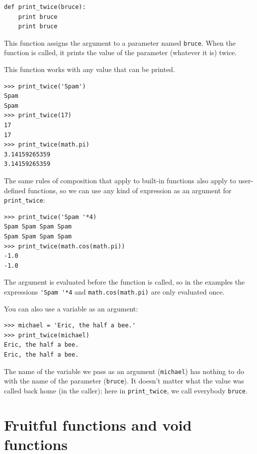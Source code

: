 \documentclass[10pt]{book}
\begin{document}

\beforeverb
\begin{verbatim}
def print_twice(bruce):
    print bruce
    print bruce
\end{verbatim}
\afterverb
%
This function assigns the argument to a parameter
named {\tt bruce}.  When the function is called, it prints the value of
the parameter (whatever it is) twice.

This function works with any value that can be printed.

\beforeverb
\begin{verbatim}
>>> print_twice('Spam')
Spam
Spam
>>> print_twice(17)
17
17
>>> print_twice(math.pi)
3.14159265359
3.14159265359
\end{verbatim}
\afterverb
%
The same rules of composition that apply to built-in functions also
apply to user-defined functions, so we can use any kind of expression
as an argument for \verb"print_twice":


\beforeverb
\begin{verbatim}
>>> print_twice('Spam '*4)
Spam Spam Spam Spam
Spam Spam Spam Spam
>>> print_twice(math.cos(math.pi))
-1.0
-1.0
\end{verbatim}
\afterverb
%
The argument is evaluated before the function is called, so
in the examples the expressions \verb"'Spam '*4" and
{\tt math.cos(math.pi)} are only evaluated once.


You can also use a variable as an argument:

\beforeverb
\begin{verbatim}
>>> michael = 'Eric, the half a bee.'
>>> print_twice(michael)
Eric, the half a bee.
Eric, the half a bee.
\end{verbatim}
\afterverb
%
The name of the variable we pass as an argument ({\tt michael}) has
nothing to do with the name of the parameter ({\tt bruce}).  It
doesn't matter what the value was called back home (in the caller);
here in \verb"print_twice", we call everybody {\tt bruce}.

\section{Fruitful functions and void functions}

\end{document}
